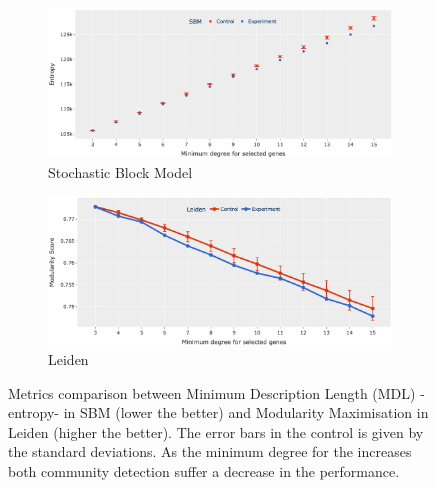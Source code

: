 \begin{figure}[!h]
    \centering
    \begin{subfigure}[!t]{1.0\textwidth}
        \includegraphics[width=\textwidth]{Sections/Network_I/Resources/selective_pruning/com_comp/sbm_ent_sel_prun.png}
        \caption{Stochastic Block Model}
        \label{fig:N_I:sbm_com_det_met}
    \end{subfigure}\hspace{\fill} 
    \begin{subfigure}[!t]{1.0\textwidth}
        \includegraphics[width=\linewidth]{Sections/Network_I/Resources/selective_pruning/com_comp/leid_mod_sel_prun.png}
        \caption{Leiden}
        \label{fig:N_I:leid_com_det_met}
    \end{subfigure}
    \caption[Metrics comparison between Leiden and SBM]{Metrics comparison between Minimum Description Length (MDL) - entropy- in SBM (lower the better) and Modularity Maximisation in Leiden (higher the better). The error bars in the control is given by the standard deviations. As the minimum degree for the increases both community detection suffer a decrease in the performance. }
    \label{fig:N_I:com_det_met}
\end{figure}


